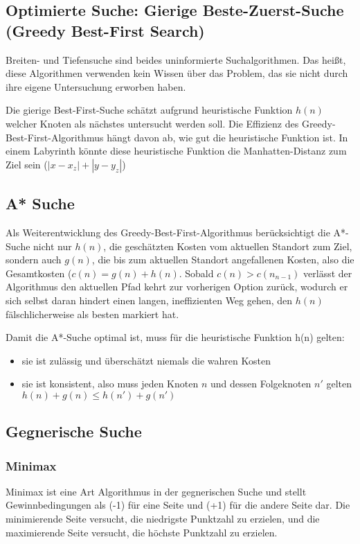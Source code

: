 \subsection{Optimierte Suche: Gierige Beste-Zuerst-Suche (Greedy Best-First Search)}
Breiten- und Tiefensuche sind beides uninformierte Suchalgorithmen. Das heißt, diese Algorithmen verwenden kein Wissen über das Problem, das sie nicht durch ihre eigene Untersuchung erworben haben. 

Die gierige Best-First-Suche schätzt aufgrund heuristische Funktion $h(n)$ welcher Knoten als nächstes untersucht werden soll. Die Effizienz des Greedy-Best-First-Algorithmus hängt davon ab, wie gut die heuristische Funktion ist. In einem Labyrinth könnte diese heuristische Funktion die Manhatten-Distanz zum Ziel sein ($|x - x_z| + |y - y_z|$)

\subsection{A* Suche}
Als Weiterentwicklung des Greedy-Best-First-Algorithmus berücksichtigt die A*-Suche nicht nur $h(n)$, die geschätzten Kosten vom aktuellen Standort zum Ziel, sondern auch $g(n)$, die bis zum aktuellen Standort angefallenen Kosten, also die Gesamtkosten ($c(n) = g(n) + h(n)$. Sobald $c(n) > c(n_{n-1})$ verlässt der Algorithmus den aktuellen Pfad kehrt zur vorherigen Option zurück, wodurch er sich selbst daran hindert einen langen, ineffizienten Weg gehen, den $h(n)$ fälschlicherweise als besten markiert hat.

Damit die A*-Suche optimal ist, muss für die heuristische Funktion h(n) gelten:
\begin{itemize}
 \item sie ist zulässig und überschätzt niemals die wahren Kosten
 \item sie ist konsistent, also muss jeden Knoten $n$ und dessen Folgeknoten $n'$ gelten $h(n) + g(n) \leq h(n') + g(n')$

\end{itemize}

\subsection{Gegnerische Suche}


\subsubsection{Minimax}
Minimax ist eine Art Algorithmus in der gegnerischen Suche und stellt Gewinnbedingungen als (-1) für eine Seite und (+1) für die andere Seite dar. Die minimierende Seite versucht, die niedrigste Punktzahl zu erzielen, und die maximierende Seite versucht, die höchste Punktzahl zu erzielen.

